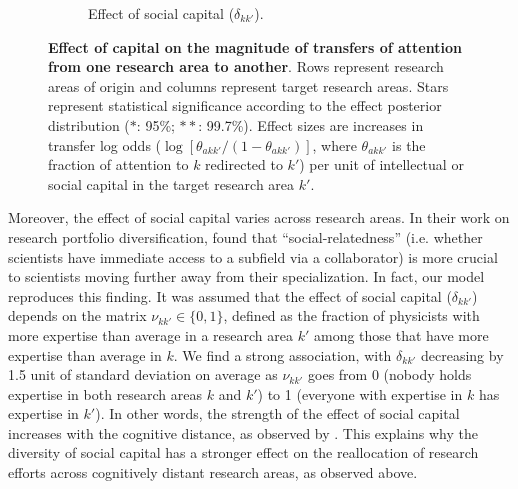 \documentclass{article}
\begin{document}
\begin{figure}[h]
\begin{subfigure}{.5\textwidth}
    \caption{Effect of social capital ($\delta_{kk'}$).}
    \label{fig:social-capital-effect}
\end{subfigure}
\caption{\textbf{Effect of capital on the magnitude of transfers of attention from one research area to another}. Rows represent research areas of origin and columns represent target research areas. Stars represent statistical significance according to the effect posterior distribution ($\ast$: 95\%; $\ast\ast$: 99.7\%). Effect sizes are increases in transfer log odds ($\log {[\theta_{akk'}/(1-\theta_{akk'})]}$, where $\theta_{akk'}$ is the fraction of attention to $k$ redirected to $k'$) per unit of intellectual or social capital in the target research area $k'$.}
\label{fig:test}
\end{figure}

Moreover, the effect of social capital varies across research areas. In their work on research portfolio diversification, \citet{Tripodi2020} found that ``social-relatedness'' (i.e. whether scientists have immediate access to a subfield via a collaborator) is more crucial to scientists moving further away from their specialization. In fact, our model reproduces this finding. It was assumed that the effect of social capital ($\delta_{kk'}$) depends on the matrix $\nu_{kk'}\in\{0,1\}$, defined as the fraction of physicists with more expertise than average in a research area $k'$ among those that have more expertise than average in $k$. We find a strong association, with $\delta_{kk'}$ decreasing by 1.5 unit of standard deviation on average as $\nu_{kk'}$ goes from 0 (nobody holds expertise in both research areas $k$ and $k'$) to 1 (everyone with expertise in $k$ has expertise in $k'$). In other words, the strength of the effect of social capital increases with the cognitive distance, as observed by \citet{Tripodi2020}. This explains why the diversity of social capital has a stronger effect on the reallocation of research efforts across cognitively distant research areas, as observed above.

\end{document}
